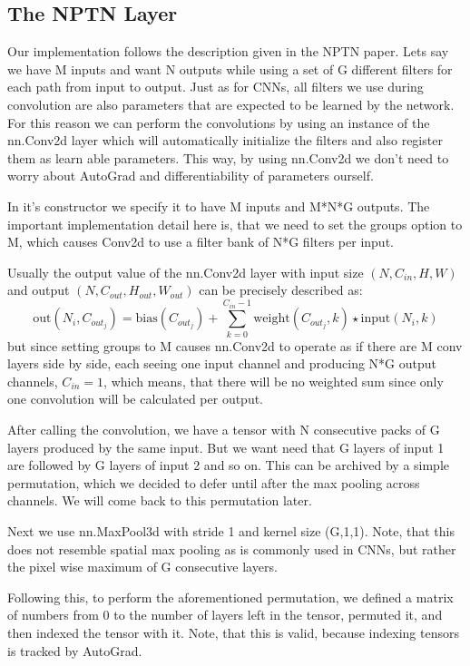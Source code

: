 \documentclass{llncs}
\begin{document}
\subsection{The NPTN Layer}
Our implementation follows the description given in the NPTN paper.
Lets say we have M inputs and want N outputs while using a set of G different filters for each path from input to output.
Just as for CNNs, all filters we use during convolution are also parameters that are expected to be learned by the network.
For this reason we can perform the convolutions by using an instance of the nn.Conv2d layer which will automatically initialize the filters and also register them as learn able parameters. This way, by using nn.Conv2d we don't need to worry about AutoGrad and differentiability of parameters ourself.

In it's constructor we specify it to have M inputs and M*N*G outputs. The important implementation detail here is, that we need to set the groups option to M, which causes Conv2d to use a filter bank of N*G filters per input.

Usually the output value of the nn.Conv2d layer with input size $(N, C_{in}, H, W)$ and output $(N, C_{out}, H_{out}, W_{out})$ can be precisely described as:
\begin{equation*}
\text{out}(N_i, C_{out_j}) = \text{bias}(C_{out_j}) +
\sum_{k = 0}^{C_{in} - 1} \text{weight}(C_{out_j}, k) \star \text{input}(N_i, k)
\end{equation*}
but since setting groups to M causes nn.Conv2d to operate as if there are M conv layers side by side, each seeing one input channel and producing N*G output channels, $C_{in} = 1$, which means, that there will be no weighted sum since only one convolution will be calculated per output.

After calling the convolution, we have a tensor with N consecutive packs of G layers produced by the same input. But we want need that G layers of input 1 are followed by G layers of input 2 and so on. This can be archived by a simple permutation, which we decided to defer until after the max pooling across channels. We will come back to this permutation later.

Next we use nn.MaxPool3d with stride 1 and kernel size (G,1,1). Note, that this does not resemble spatial max pooling as is commonly used in CNNs, but rather the pixel wise maximum of G consecutive layers.

Following this, to perform the aforementioned permutation, we defined a matrix of numbers from 0 to the number of layers left in the tensor, permuted it, and then indexed the tensor with it. Note, that this is valid, because indexing tensors is tracked by AutoGrad.
\end{document}
